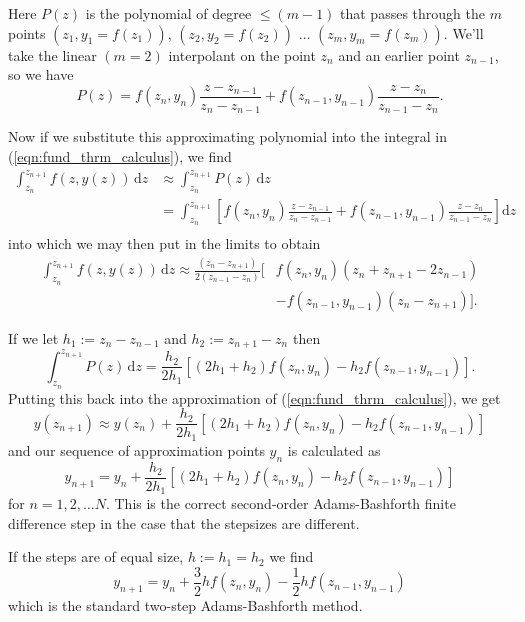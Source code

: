     Here $P(z)$ is the polynomial of degree $\le (m-1)$ that passes through the
    $m$ points $(z_1, y_1 = f(z_1))$, $(z_2, y_2 = f(z_2))$ $\dots$ $(z_m, y_m =
    f(z_m))$. We'll take the linear $(m = 2)$ interpolant on the point $z_{n}$
    and an earlier point $z_{n-1}$, so we have
    \begin{equation}
      P(z) = f(z_n, y_n)\frac{z - z_{n-1}}{z_n - z_{n-1}} + 
            f(z_{n-1}, y_{n-1})\frac{z - z_{n}}{z_{n-1} - z_n}.
    \end{equation}

    Now if we substitute this approximating polynomial into the integral in
    (\ref{eqn:fund_thrm_calculus}), we find
    \begin{align*}
      \int_{z_n}^{z_{n+1}} \! f(z,y(z)) \, \mathrm{d}z 
      &\approx \int_{z_n}^{z_{n+1}} \! P(z) \, \mathrm{d}z \\
      &= \int_{z_n}^{z_{n+1}} \! \left[ f(z_n, y_n)\frac{z - z_{n-1}}{z_n - 
      z_{n-1}} + f(z_{n-1}, y_{n-1})\frac{z - z_{n}}{z_{n-1} - z_n} \right] 
      \mathrm{d}z \\
    \end{align*}
    into which we may then put in the limits to obtain
    \begin{align}
      \int_{z_n}^{z_{n+1}} \! f(z,y(z)) \, \mathrm{d}z 
      \approx \frac{(z_n - z_{n+1})}{2(z_{n-1}-z_n)} \Big[ & f(z_n,y_n)(z_n + 
      z_{n+1} - 2z_{n-1}) \nonumber \\ 
        & - f(z_{n-1},y_{n-1})(z_n - z_{n+1}) \Big].
    \end{align}

    If we let $h_1 := z_n - z_{n-1}$ and $h_2 := z_{n+1} - z_n$ then
    \begin{equation*}
      \int_{z_n}^{z_{n+1}} \! P(z) \, \mathrm{d}z = \frac{h_2}{2 h_1} 
      \left[ (2 h_1 + h_2) f(z_n,y_n) - h_2 f(z_{n-1},y_{n-1}) \right].
    \end{equation*}
    Putting this back into the approximation of (\ref{eqn:fund_thrm_calculus}), 
    we get
    \begin{equation*}
      y(z_{n+1}) \approx y(z_{n}) + \frac{h_2}{2 h_1} \left[ (2 h_1 + h_2) 
      f(z_n,y_n)  - h_2 f(z_{n-1},y_{n-1}) \right] 
    \end{equation*}
    and our sequence of approximation points $y_n$ is calculated as
    \begin{equation}\label{eqn:ab_step_different}
      y_{n+1} = y_n + \frac{h_2}{2 h_1} \left[ (2 h_1 + h_2) f(z_n,y_n)  - 
      h_2 f(z_{n-1},y_{n-1}) \right]
    \end{equation}
    for $n = 1, 2, \dots N$. This is the correct second-order Adams-Bashforth 
    finite difference step in the case that the stepsizes are different.

    If the steps are of equal size, \ie $h := h_1 =
    h_2$ we find
    \begin{equation}\label{eqn:ab_step_standard}
      y_{n+1} = y_n + \frac{3}{2} h f(z_n,y_n) - \frac{1}{2} h f(z_{n-1}, 
      y_{n-1})
    \end{equation}
    which is the standard two-step Adams-Bashforth method\cite{edsberg2008introduction,bashforth1883attempt}.